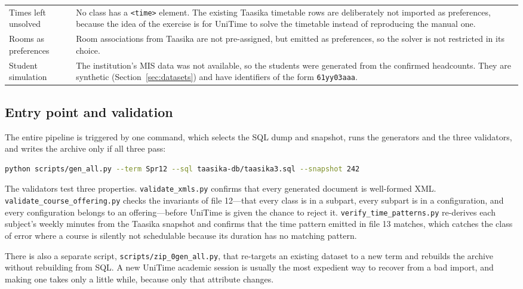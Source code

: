 \begin{table}[H]
\begin{tabular}{@{}L{3.5cm}L{11.4cm}@{}}
\addlinespace
Times left unsolved &
  No class has a \texttt{<time>} element. The existing Taasika timetable rows are deliberately
  not imported as preferences, because the idea of the exercise is for UniTime to solve the
  timetable instead of reproducing the manual one. \\
\addlinespace
Rooms as preferences &
  Room associations from Taasika are not pre-assigned, but emitted as preferences, so the solver
  is not restricted in its choice. \\
\addlinespace
Student simulation &
  The institution's MIS data was not available, so the students were generated from the confirmed
  headcounts. They are synthetic (Section~\ref{sec:datasets}) and have identifiers of the form
  \texttt{61yy03aaa}. \\
\bottomrule
\end{tabular}
\end{table}

\subsection{Entry point and validation}

The entire pipeline is triggered by one command, which selects the SQL dump and snapshot, runs the
generators and the three validators, and writes the archive only if all three pass:

\begin{lstlisting}[style=plainlst,language=bash,caption={Regenerating the complete dataset.},label={lst:genall}]
python scripts/gen_all.py --term Spr12 --sql taasika-db/taasika3.sql --snapshot 242
\end{lstlisting}

The validators test three properties. \texttt{validate\_xmls.py} confirms that every generated
document is well-formed XML. \texttt{validate\_course\_offering.py} checks the invariants of file
12---that every class is in a subpart, every subpart is in a configuration, and every
configuration belongs to an offering---before UniTime is given the chance to reject it.
\texttt{verify\_time\_patterns.py} re-derives each subject's weekly minutes from the Taasika
snapshot and confirms that the time pattern emitted in file 13 matches, which catches the class of
error where a course is silently not schedulable because its duration has no matching pattern.

There is also a separate script, \texttt{scripts/zip\_0gen\_all.py}, that re-targets an existing
dataset to a new term and rebuilds the archive without rebuilding from SQL. A new UniTime academic
session is usually the most expedient way to recover from a bad import, and making one takes only
a little while, because only that attribute changes.
